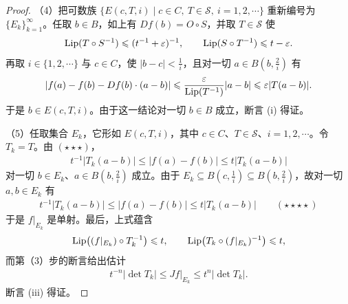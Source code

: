 \documentclass[../../main.tex]{subfiles}%
\begin{document}
\begin{proof}
（4）把可数族 $\{E(c,T,i)\mid c\in C,\ T\in\mathcal{S},\ i=1,2,\cdots\}$ 重新编号为 $\{E_k\}_{k=1}^{\infty}$。任取 $b\in B$，如上有 $Df(b)=O\circ S$，并取 $T\in\mathcal{S}$ 使
\begin{align*}
\operatorname{Lip}(T\circ S^{-1})\leqslant(t^{-1}+\varepsilon)^{-1},\qquad \operatorname{Lip}(S\circ T^{-1})\leqslant t-\varepsilon .
\end{align*}
再取 $i\in\{1,2,\cdots\}$ 与 $c\in C$，使 $\lvert b-c\rvert<\frac1i$，且对一切 $a\in B(b,\frac2i)$ 有
\begin{align*}
\lvert f(a)-f(b)-Df(b)\cdot(a-b)\rvert\leqslant\frac{\varepsilon}{\operatorname{Lip}(T^{-1})}\lvert a-b\rvert\leqslant\varepsilon\lvert T(a-b)\rvert .
\end{align*}
于是 $b\in E(c,T,i)$。由于这一结论对一切 $b\in B$ 成立，断言 (i) 得证。

（5）任取集合 $E_k$，它形如 $E(c,T,i)$，其中 $c\in C$、$T\in\mathcal{S}$、$i=1,2,\cdots$。令 $T_k=T$。由 $(\star\star\star)$，
\begin{align*}
t^{-1}\lvert T_k(a-b)\rvert\leqslant\lvert f(a)-f(b)\rvert\leqslant t\lvert T_k(a-b)\rvert
\end{align*}
对一切 $b\in E_k$、$a\in B(b,\frac2i)$ 成立。由于 $E_k\subseteq B(c,\frac1i)\subseteq B(b,\frac2i)$，故对一切 $a,b\in E_k$ 有
\begin{align*}
t^{-1}\lvert T_k(a-b)\rvert\leqslant\lvert f(a)-f(b)\rvert\leqslant t\lvert T_k(a-b)\rvert\qquad(\star\star\star\star)
\end{align*}
于是 $f|_{E_k}$ 是单射。最后，上式蕴含
\begin{align*}
\operatorname{Lip}\bigl((f|_{E_k})\circ T_k^{-1}\bigr)\leqslant t,\qquad \operatorname{Lip}\bigl(T_k\circ(f|_{E_k})^{-1}\bigr)\leqslant t,
\end{align*}
而第（3）步的断言给出估计
\begin{align*}
t^{-n}\lvert\det T_k\rvert\leqslant Jf|_{E_k}\leqslant t^n\lvert\det T_k\rvert .
\end{align*}
断言 (iii) 得证。
\end{proof}
\end{document}
